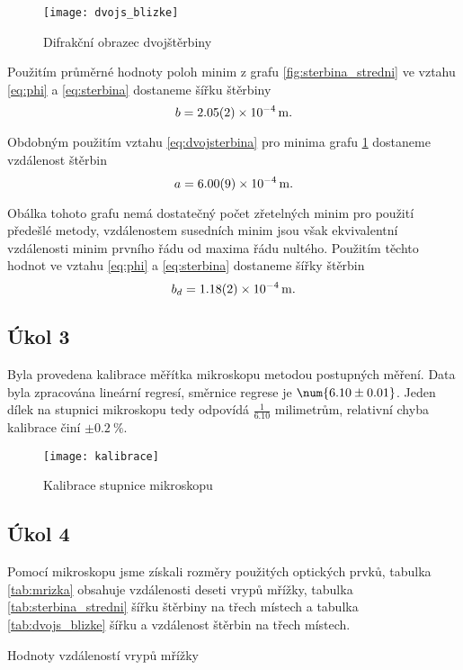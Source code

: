 \documentclass{protokol}
\begin{document}
      \begin{figure}[H]
        \centering
        \texttt{[image: dvojs\_blizke]}
        \caption{Difrakční obrazec dvojštěrbiny}
        \label{fig:dvojs_blizke}
      \end{figure}

      Použitím průměrné hodnoty poloh minim z grafu \ref{fig:sterbina_stredni} ve vztahu \eqref{eq:phi} a \eqref{eq:sterbina} dostaneme šířku štěrbiny 
      $$ b = \SI{2.05 \pm 0.02 e-4}{m}. $$
      
      Obdobným použitím vztahu \eqref{eq:dvojsterbina} pro minima grafu \ref{fig:dvojs_blizke} dostaneme vzdálenost štěrbin
      $$ a = \SI{6.00 \pm 0.09 e-4}{m}. $$

      Obálka tohoto grafu nemá dostatečný počet zřetelných minim pro použití předešlé metody, vzdálenostem susedních minim jsou však ekvivalentní vzdálenosti minim prvního řádu od maxima řádu nultého. Použitím těchto hodnot ve vztahu \eqref{eq:phi} a \eqref{eq:sterbina} dostaneme šířky štěrbin 
      $$ b_d = \SI{1.18 \pm 0.02 e-4}{m}. $$

    \subsection*{Úkol 3}

      Byla provedena kalibrace měřítka mikroskopu metodou postupných měření. Data byla zpracována lineární regresí, směrnice regrese je $\num{6.10 \pm 0.01}$. Jeden dílek na stupnici mikroskopu tedy odpovídá $\frac{1}{\num{6.10}}$ milimetrům, relativní chyba kalibrace činí $\pm \SI{0.2}{\percent}$.

      \begin{figure}[H]
        \centering
        \texttt{[image: kalibrace]}
        \caption{Kalibrace stupnice mikroskopu}
        \label{fig:kalibrace}
      \end{figure}

    \subsection*{Úkol 4}

      Pomocí mikroskopu jsme získali rozměry použitých optických prvků, tabulka \ref{tab:mrizka} obsahuje vzdálenosti deseti vrypů mřížky, tabulka \ref{tab:sterbina_stredni} šířku štěrbiny na třech místech a tabulka \ref{tab:dvojs_blizke} šířku a vzdálenost štěrbin na třech místech.

      \begin{table}[H]
        \centering
        \setlength{\tabcolsep}{10pt}
        
        \caption{Hodnoty vzdáleností vrypů mřížky}
        \label{tab:mrizka}
      \end{table}
\end{document}
